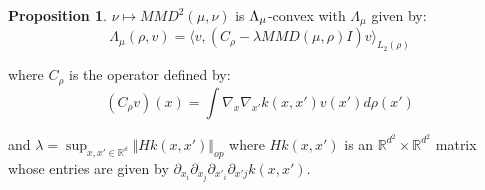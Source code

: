 \documentclass{article}
\newcommand{\1}{\mathbbm 1}
\theoremstyle{definition}
\newtheorem{proposition}[theorem]{Proposition}
\begin{document}
\begin{proposition}
\label{prop:lambda_convexity}$\nu\mapsto MMD^{2}(\mu,\nu)$ is $\text{\ensuremath{\Lambda_{\mu}}}$-convex
with $\Lambda_{\mu}$ given by:
\begin{equation}
\Lambda_{\mu}(\rho,v)=\langle v,(C_{\rho}-\lambda MMD(\mu,\rho)I)v\rangle_{L_{2}(\rho)}\label{eq:Lambda}
\end{equation}

where $C_{\rho}$ is the operator defined by:
\[
(C_{\rho}v)(x)=\int\nabla_{x}\nabla_{x'}k(x,x')v(x')d\rho(x')
\]

and $\lambda=\sup_{x,x'\in\mathbb{\mathbb{R}^{d}}}\Vert Hk(x,x')\Vert_{op}$
where $Hk(x,x')$ is an $\mathbb{R}^{d^{2}}\times\mathbb{R}^{d^{2}}$
matrix whose entries are given by $\partial_{x_{i}}\partial_{x_{j}}\partial_{x'_{i}}\partial_{x'j}k(x,x')$.
\end{proposition}
%
\end{document}
